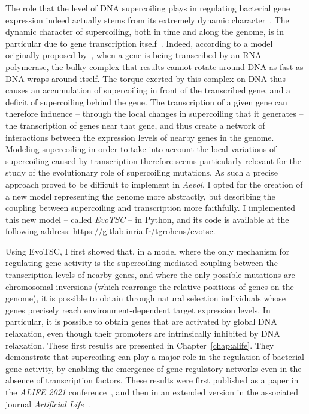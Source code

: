 The role that the level of DNA supercoiling plays in regulating bacterial gene expression indeed actually stems from its extremely dynamic character~\citep{martisb.2019}.
The dynamic character of supercoiling, both in time and along the genome, is in particular due to gene transcription itself~\citep{visser2022}.
Indeed, according to a model originally proposed by~\cite{liu1987}, when a gene is being transcribed by an RNA polymerase, the bulky complex that results cannot rotate around DNA as fast as DNA wraps around itself.
The torque exerted by this complex on DNA thus causes an accumulation of supercoiling in front of the transcribed gene, and a deficit of supercoiling behind the gene.
The transcription of a given gene can therefore influence -- through the local changes in supercoiling that it generates -- the transcription of genes near that gene, and thus create a network of interactions between the expression levels of nearby genes in the genome.
Modeling supercoiling in order to take into account the local variations of supercoiling caused by transcription therefore seems particularly relevant for the study of the evolutionary role of supercoiling mutations.
As such a precise approach proved to be difficult to implement in \emph{Aevol}, I opted for the creation of a new model representing the genome more abstractly, but describing the coupling between supercoiling and transcription more faithfully.
I implemented this new model -- called \emph{EvoTSC} -- in Python, and its code is available at the following address: \url{https://gitlab.inria.fr/tgrohens/evotsc}.

Using EvoTSC, I first showed that, in a model where the only mechanism for regulating gene activity is the supercoiling-mediated coupling between the transcription levels of nearby genes, and where the only possible mutations are chromosomal inversions (which rearrange the relative positions of genes on the genome), it is possible to obtain through natural selection individuals whose genes precisely reach environment-dependent target expression levels.
In particular, it is possible to obtain genes that are activated by global DNA relaxation, even though their promoters are intrinsically inhibited by DNA relaxation.
These first results are presented in Chapter~\ref{chap:alife}.
They demonstrate that supercoiling can play a major role in the regulation of bacterial gene activity, by enabling the emergence of gene regulatory networks even in the absence of transcription factors.
These results were first published as a paper in the \emph{ALIFE 2021} conference~\citep{grohens2021}, and then in an extended version in the associated journal \emph{Artificial Life}~\citep{grohens2022a}.

